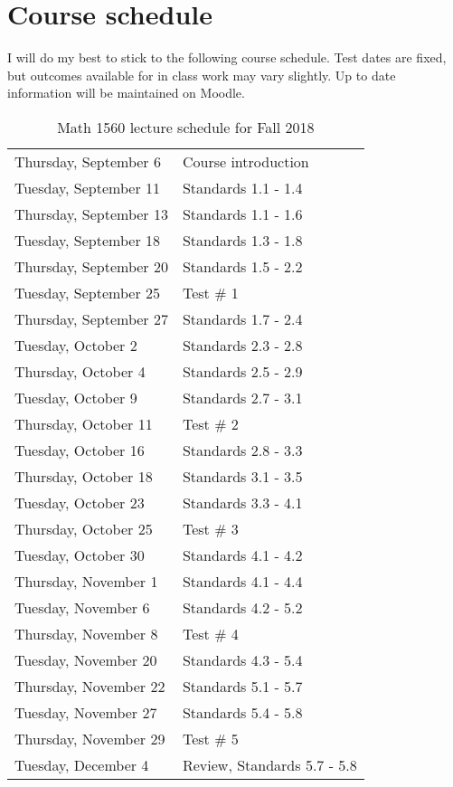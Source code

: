\documentclass[10pt,]{article}
\begin{document}
\section[{Course schedule}]{Course schedule}\label{section-schedule}
\hypertarget{p-58}{}%
I will do my best to stick to the following course schedule. Test dates are fixed, but outcomes available for in class work may vary slightly. Up to date information will be maintained on Moodle.%
\begin{table}
\centering
\begin{tabular}{ll}
Thursday, September 6&Course introduction\tabularnewline[0pt]
Tuesday, September 11&Standards 1.1 - 1.4\tabularnewline[0pt]
Thursday, September 13&Standards 1.1 - 1.6\tabularnewline[0pt]
Tuesday, September 18&Standards 1.3 - 1.8\tabularnewline[0pt]
Thursday, September 20&Standards 1.5 - 2.2\tabularnewline[0pt]
Tuesday, September 25&Test \# 1\tabularnewline[0pt]
Thursday, September 27&Standards 1.7 - 2.4\tabularnewline[0pt]
Tuesday, October 2&Standards 2.3 - 2.8\tabularnewline[0pt]
Thursday, October 4&Standards 2.5 - 2.9\tabularnewline[0pt]
Tuesday, October 9&Standards 2.7 - 3.1\tabularnewline[0pt]
Thursday, October 11&Test \# 2\tabularnewline[0pt]
Tuesday, October 16&Standards 2.8 - 3.3\tabularnewline[0pt]
Thursday, October 18&Standards 3.1 - 3.5\tabularnewline[0pt]
Tuesday, October 23&Standards 3.3 - 4.1\tabularnewline[0pt]
Thursday, October 25&Test \# 3\tabularnewline[0pt]
Tuesday, October 30&Standards 4.1 - 4.2\tabularnewline[0pt]
Thursday, November 1&Standards 4.1 - 4.4\tabularnewline[0pt]
Tuesday, November 6&Standards 4.2 - 5.2\tabularnewline[0pt]
Thursday, November 8&Test \# 4\tabularnewline[0pt]
Tuesday, November 20&Standards 4.3 - 5.4\tabularnewline[0pt]
Thursday, November 22&Standards 5.1 - 5.7\tabularnewline[0pt]
Tuesday, November 27&Standards 5.4 - 5.8\tabularnewline[0pt]
Thursday, November 29&Test \# 5\tabularnewline[0pt]
Tuesday, December 4&Review, Standards 5.7 - 5.8
\end{tabular}
\caption{Math 1560 lecture schedule for Fall 2018\label{table-schedule}}
\end{table}
\end{document}
